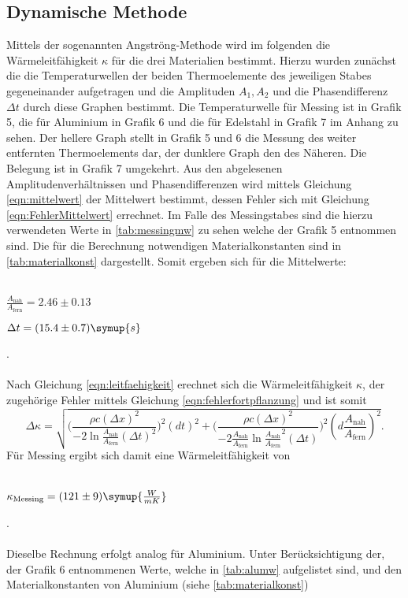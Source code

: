 \subsection{Dynamische Methode}
Mittels der sogenannten Angströng-Methode wird im folgenden die Wärmeleitfähigkeit $\kappa$ für die drei Materialien bestimmt.
Hierzu wurden zunächst die die Temperaturwellen der beiden Thermoelemente des jeweiligen Stabes gegeneinander aufgetragen und die Amplituden $A_1,A_2$ und die Phasendifferenz $\Delta t$ durch diese Graphen bestimmt.
Die Temperaturwelle für Messing ist in Grafik 5, die für Aluminium in Grafik 6 und die für Edelstahl in Grafik 7 im Anhang zu sehen. Der hellere Graph stellt in Grafik 5 und 6
die Messung des weiter entfernten Thermoelements dar, der dunklere Graph den des Näheren. Die Belegung ist in Grafik 7 umgekehrt.
Aus den abgelesenen Amplitudenverhältnissen und Phasendifferenzen wird mittels Gleichung \eqref{eqn:mittelwert} der Mittelwert bestimmt, dessen Fehler sich mit Gleichung \eqref{eqn:FehlerMittelwert} errechnet.
Im Falle des Messingstabes sind die hierzu verwendeten Werte in \autoref{tab:messingmw} zu sehen welche der Grafik 5 entnommen sind.
Die für die Berechnung notwendigen Materialkonstanten sind in \autoref{tab:materialkonst} dargestellt.
Somit ergeben sich für die Mittelwerte:
\\ \\
\centerline{$\frac{A_\text{nah}}{A_\text{fern}} = 2.46 \pm 0.13$}
\centerline{$\Delta t = (15.4 \pm 0.7) \symup{s}$}.
\\ \\
Nach Gleichung \eqref{eqn:leitfaehigkeit} erechnet sich die Wärmeleitfähigkeit $\kappa$, der zugehörige Fehler mittels Gleichung \eqref{eqn:fehlerfortpflanzung}
und ist somit 
\begin{equation}
\label{eqn:fehlerkappa}
\Delta \kappa = \sqrt{\biggl (\frac{\rho c (\Delta x)^2}{-2 \ln{\frac{A_\text{nah}}{A_\text{fern}}} (\Delta t)^2 }\biggr)^2(dt)^2 + \biggl(\frac{\rho c (\Delta x)^2}{-2 \frac{A_\text{nah}}{A_\text{fern}} \ln{\frac{A_\text{nah}}{A_\text{fern}}}^2 (\Delta t)} \biggr )^2 (d\frac{A_\text{nah}}{A_\text{fern}})^2 }.
\end{equation}
Für Messing ergibt sich damit eine Wärmeleitfähigkeit von
\\ \\
\centerline{$\kappa_\text{Messing} = (121 \pm 9) \symup{\frac{W}{mK}}$}.
\\ \\
Dieselbe Rechnung erfolgt analog für Aluminium.
Unter Berücksichtigung der, der Grafik 6 entnommenen Werte, welche in \autoref{tab:alumw} aufgelistet sind, und den Materialkonstanten von Aluminium (siehe \autoref{tab:materialkonst})
